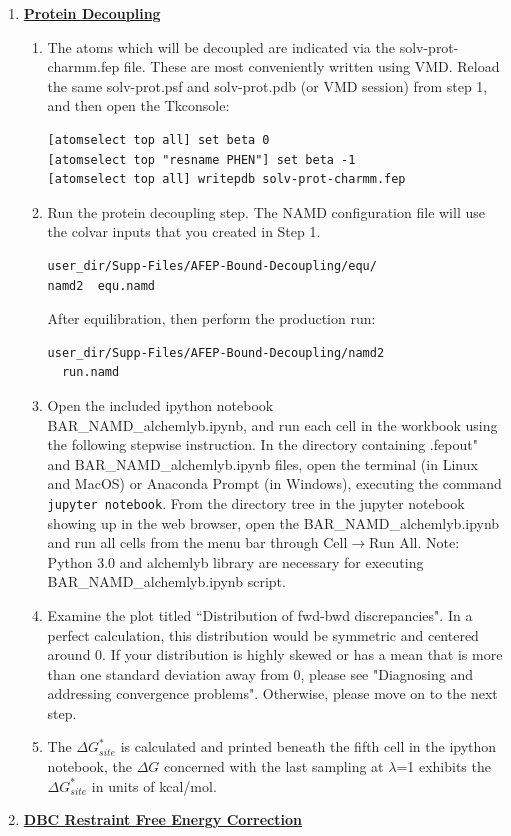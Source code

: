 \documentclass[9pt,tutorial]{livecoms}
\begin{document}
\begin{enumerate}[left=0pt .. \parindent]
\item {\bf \hyperref[section 7]{Protein Decoupling}}
\begin{enumerate}
\item The atoms which will be decoupled are indicated via the solv-prot-charmm.fep file. These are most conveniently written using VMD. Reload the same solv-prot.psf and solv-prot.pdb (or VMD session) from step 1, and then open the Tkconsole:  
\begin{verbatim}
[atomselect top all] set beta 0
[atomselect top "resname PHEN"] set beta -1
[atomselect top all] writepdb solv-prot-charmm.fep
\end{verbatim}
\item Run the protein decoupling step. The NAMD configuration file will use the colvar inputs that you created in Step 1. 
\begin{verbatim}
user_dir/Supp-Files/AFEP-Bound-Decoupling/equ/
namd2  equ.namd
\end{verbatim}
After equilibration, then perform the production run:
\begin{verbatim}
user_dir/Supp-Files/AFEP-Bound-Decoupling/namd2
  run.namd
\end{verbatim}
\item Open the included ipython notebook\\ BAR\_NAMD\_alchemlyb.ipynb, and run each cell in the workbook using the following stepwise instruction. %
In the directory containing .fepout" and BAR\_NAMD\_alchemlyb.ipynb files, open the terminal (in Linux and MacOS) or Anaconda Prompt (in Windows), executing the command \texttt{jupyter notebook}. From the directory tree in the jupyter notebook showing up in the web browser, open the BAR\_NAMD\_alchemlyb.ipynb and run all cells from the menu bar through Cell${\rightarrow}$Run All. Note: Python 3.0 and alchemlyb library are necessary for executing BAR\_NAMD\_alchemlyb.ipynb script. 


\item Examine the plot titled ``Distribution of fwd-bwd discrepancies". In a perfect calculation, this distribution would be symmetric and centered around 0. If your distribution is highly skewed or has a mean that is more than one standard deviation away from 0, please see "Diagnosing and addressing convergence problems". Otherwise, please move on to the next step. 
\item The ${\Delta G^*_{site}}$ is calculated and printed beneath the fifth cell in the ipython notebook, the ${\Delta G}$ concerned with the last sampling at {$\lambda$}=1 exhibits the ${\Delta G^*_{site}}$ in units of kcal/mol.
\end{enumerate}
\item {\bf \hyperref[sec:10]{DBC Restraint Free Energy Correction}}


\end{enumerate}
\end{document}
